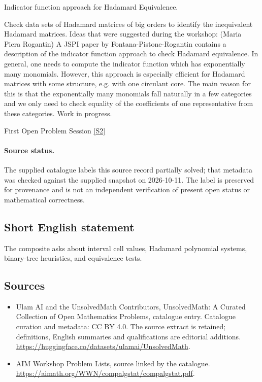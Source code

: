 \documentclass[11pt]{article}
\begin{document}
Indicator function approach for Hadamard Equivalence.

Check data sets of Hadamard matrices of big orders to identify the inequivalent Hadamard matrices. Ideas that were suggested during the workshop: (Maria Piera Rogantin) A JSPI paper by Fontana-Pistone-Rogantin contains a description of the indicator function approach to check Hadamard equivalence. In general, one needs to compute the indicator function which has exponentially many monomials. However, this approach is especially efficient for Hadamard matrices with some structure, e.g. with one circulant core. The main reason for this is that the exponentially many monomials fall naturally in a few categories and we only need to check equality of the coefficients of one representative from these categories. Work in progress.

First Open Problem Session \href{https://aimath.org/WWN/compalgstat/compalgstat.pdf}{[S2]}
\paragraph{Source status.}
The supplied catalogue labels this source record partially solved; that metadata was checked against the supplied snapshot on 2026-10-11. The label is preserved for provenance and is not an independent verification of present open status or mathematical correctness.
\subsection{Short English statement}
The composite asks about interval cell values, Hadamard polynomial systems, binary-tree heuristics, and equivalence tests.
\subsection{Sources}
\begin{itemize}
\item[S1] Ulam AI and the UnsolvedMath Contributors, UnsolvedMath: A Curated Collection of Open Mathematics Problems, catalogue entry. Catalogue curation and metadata: CC BY 4.0. The source extract is retained; definitions, English summaries and qualifications are editorial additions.
\url{https://huggingface.co/datasets/ulamai/UnsolvedMath}.
\item[S2] AIM Workshop Problem Lists, source linked by the catalogue.
\url{https://aimath.org/WWN/compalgstat/compalgstat.pdf}.
\end{itemize}
\end{document}
